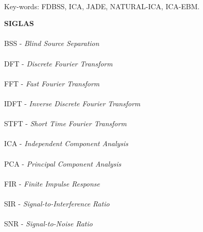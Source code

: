 \paragraph{}
\noindent Key-words: FDBSS, ICA, JADE, NATURAL-ICA, ICA-EBM.

\pagebreak


\begin{center}
\textbf{SIGLAS}
\end{center}
      \vspace{0.5cm}

\paragraph{}BSS  - \textit{Blind Source Separation}
\paragraph{}DFT  - \textit{Discrete Fourier Transform}
\paragraph{}FFT  - \textit{Fast Fourier Transform}
\paragraph{}IDFT  - \textit{Inverse Discrete Fourier Transform}
\paragraph{}STFT - \textit{Short Time Fourier Transform}
\paragraph{}ICA  - \textit{Independent Component Analysis}
\paragraph{}PCA  - \textit{Principal Component Analysis}
\paragraph{}FIR  - \textit{Finite Impulse Response}
\paragraph{}SIR  - \textit{Signal-to-Interference Ratio}
\paragraph{}SNR  - \textit{Signal-to-Noise Ratio}
